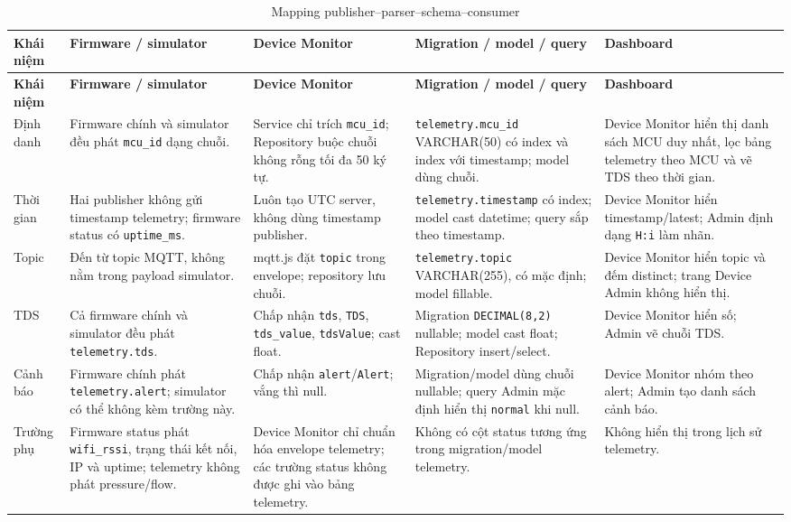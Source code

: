 \begingroup
\scriptsize
\setlength{\tabcolsep}{3pt}
\begin{longtable}{p{}p{}p{}p{}p{}}
\caption{Mapping publisher--parser--schema--consumer}\label{tab:telemetry-field-mapping}\\
\hline
\textbf{Khái niệm} & \textbf{Firmware / simulator} & \textbf{Device Monitor} &
\textbf{Migration / model / query} & \textbf{Dashboard} \\
\hline
\endfirsthead
\hline
\textbf{Khái niệm} & \textbf{Firmware / simulator} & \textbf{Device Monitor} &
\textbf{Migration / model / query} & \textbf{Dashboard} \\
\hline
\endhead
Định danh &
Firmware chính và simulator đều phát \texttt{mcu\_id} dạng chuỗi. &
Service chỉ trích \texttt{mcu\_id}; Repository buộc chuỗi không rỗng tối đa 50 ký tự. &
\texttt{telemetry.mcu\_id} VARCHAR(50) có index và index với timestamp; model dùng chuỗi. &
Device Monitor hiển thị danh sách MCU duy nhất, lọc bảng telemetry theo MCU và vẽ TDS theo thời gian. \\

Thời gian &
Hai publisher không gửi timestamp telemetry; firmware status có \texttt{uptime\_ms}. &
Luôn tạo UTC server, không dùng timestamp publisher. &
\texttt{telemetry.timestamp} có index; model cast datetime; query sắp theo timestamp. &
Device Monitor hiển timestamp/latest; Admin định dạng \texttt{H:i} làm nhãn. \\

Topic &
Đến từ topic MQTT, không nằm trong payload simulator. &
mqtt.js đặt \texttt{topic} trong envelope; repository lưu chuỗi. &
\texttt{telemetry.topic} VARCHAR(255), có mặc định; model fillable. &
Device Monitor hiển topic và đếm distinct; trang Device Admin không hiển thị. \\

TDS &
Cả firmware chính và simulator đều phát \texttt{telemetry.tds}. &
Chấp nhận \texttt{tds}, \texttt{TDS}, \texttt{tds\_value}, \texttt{tdsValue}; cast float. &
Migration \texttt{DECIMAL(8,2)} nullable; model cast float; Repository insert/select. &
Device Monitor hiển số; Admin vẽ chuỗi TDS. \\

Cảnh báo &
Firmware chính phát \texttt{telemetry.alert}; simulator có thể không kèm trường này. &
Chấp nhận \texttt{alert}/\texttt{Alert}; vắng thì null. &
Migration/model dùng chuỗi nullable; query Admin mặc định hiển thị \texttt{normal} khi null. &
Device Monitor nhóm theo alert; Admin tạo danh sách cảnh báo. \\

Trường phụ &
Firmware status phát \texttt{wifi\_rssi}, trạng thái kết nối, IP và uptime; telemetry không phát pressure/flow. &
Device Monitor chỉ chuẩn hóa envelope telemetry; các trường status không được ghi vào bảng telemetry. &
Không có cột status tương ứng trong migration/model telemetry. &
Không hiển thị trong lịch sử telemetry. \\
\hline
\end{longtable}
\endgroup

